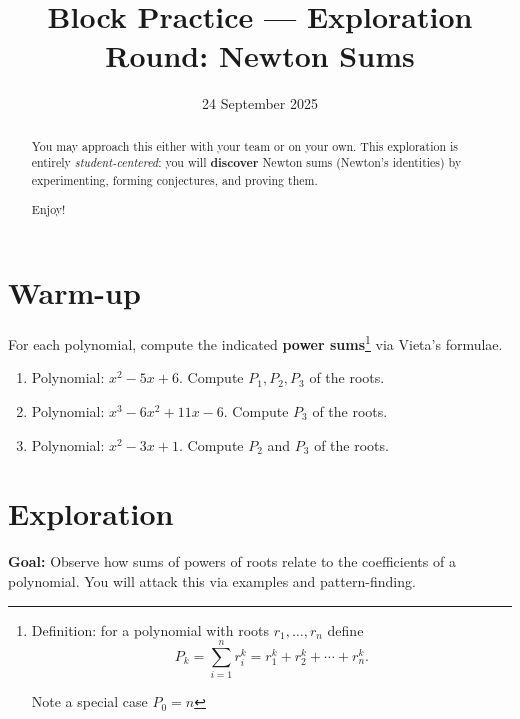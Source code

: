 \documentclass{tufte-handout}
\title{Block Practice — Exploration Round: Newton Sums}
\author[IA Math Team]{}
\date{24 September 2025}
\newcommand{\nn}[1]{\vspace{#1}\noindent}
\begin{document}
\maketitle

\begin{abstract}
You may approach this either with your team or on your own.
This exploration is entirely \emph{student-centered}: you will \textbf{discover} Newton sums (Newton's identities) by experimenting, forming conjectures, and proving them.

\nn{1em}Enjoy!

\end{abstract}

\section*{Warm-up}
For each polynomial, compute the indicated \textbf{power sums}\footnote{Definition: for a polynomial with roots $r_1,\dots,r_n$ define
\[
P_k=\sum_{i=1}^n r_i^k = r_1^k+r_2^k+\cdots+r_n^k.
\]

Note a special case $P_0=n$
} via Vieta's formulae. 

\vspace{1em}
\begin{enumerate}[label=\textbf{W\arabic*.}, leftmargin=*, itemsep=0.5em]
  \item Polynomial: $x^2-5x+6$. Compute $P_1, P_2, P_3$ of the roots.
  \item Polynomial: $x^3-6x^2+11x-6$. Compute $P_3$ of the roots.
  \item Polynomial: $x^2-3x+1$. Compute $P_2$ and $P_3$ of the roots.
\end{enumerate}

\vspace{2em}
\section*{Exploration}
\textbf{Goal:} Observe how sums of powers of roots relate to the coefficients of a polynomial.
You will attack this via examples and pattern-finding.
\end{document}
